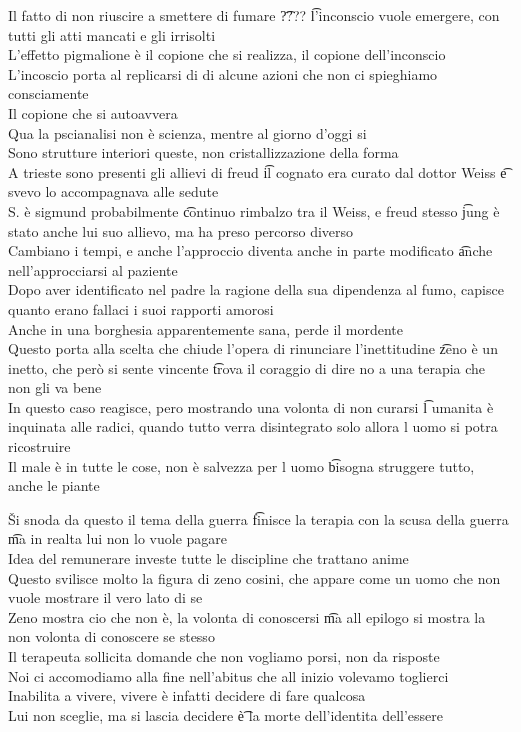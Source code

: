 \documentclass[12pt]{article}
\begin{document}
Il fatto di non riuscire a smettere di fumare \t ???? \t l'inconscio vuole emergere, con tutti gli atti mancati e gli irrisolti \\
L'effetto pigmalione è il copione che si realizza, il copione dell'inconscio \\
L'incoscio porta al replicarsi di di alcune azioni che non ci spieghiamo consciamente \\
Il copione che si autoavvera \\
Qua la pscianalisi non è scienza, mentre al giorno d'oggi si \\
Sono strutture interiori queste, non cristallizzazione della forma \\
A trieste sono presenti gli allievi di freud \t il cognato era curato dal dottor Weiss \t e svevo lo accompagnava alle sedute \\
S. è sigmund probabilmente \t continuo rimbalzo tra il Weiss, e freud stesso \t jung è stato anche lui suo allievo, ma ha preso percorso diverso \\
Cambiano i tempi, e anche l'approccio diventa anche in parte modificato \t anche nell'approcciarsi al paziente \\
Dopo aver identificato nel padre la ragione della sua dipendenza al fumo, capisce quanto erano fallaci i suoi rapporti amorosi \\
Anche in una borghesia apparentemente sana, perde il mordente \\
Questo porta alla scelta che chiude l'opera di rinunciare l'inettitudine \t zeno è un inetto, che però si sente vincente \t trova il coraggio di dire no a una terapia che non gli va bene \\
In questo caso reagisce, pero mostrando una volonta di non curarsi \t l umanita è inquinata alle radici, quando tutto verra disintegrato solo allora l uomo si potra ricostruire \\
Il male è in tutte le cose, non è salvezza per l uomo \t bisogna struggere tutto, anche le piante

\v

Si snoda da questo il tema della guerra \t finisce la terapia con la scusa della guerra \t ma in realta lui non lo vuole pagare \\
Idea del remunerare investe tutte le discipline che trattano anime \\
Questo svilisce molto la figura di zeno cosini, che appare come un uomo che non vuole mostrare il vero lato di se \\
Zeno mostra cio che non è, la volonta di conoscersi \t ma all epilogo si mostra la non volonta di conoscere se stesso \\
Il terapeuta sollicita domande che non vogliamo porsi, non da risposte \\
Noi ci accomodiamo alla fine nell'abitus che all inizio volevamo toglierci \\
Inabilita a vivere, vivere è infatti decidere di fare qualcosa \\
Lui non sceglie, ma si lascia decidere \t è la morte dell'identita dell'essere
\end{document}
